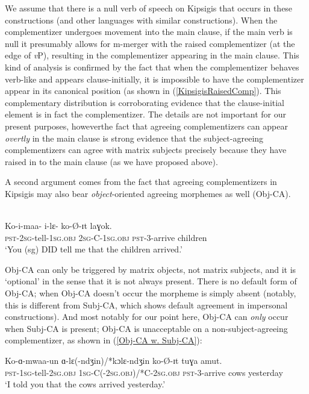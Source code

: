 We assume that there is a null verb of speech on Kipsigis that occurs in these constructions (and other languages with similar constructions). When the complementizer undergoes movement into the main clause, if the main verb is null it presumably allows for m-merger with the raised complementizer (at the edge of \textit{v}P), resulting in the complementizer appearing in the main clause. This kind of analysis is confirmed by the fact that when the complementizer behaves verb-like and appears clause-initially, it is impossible to have the complementizer appear in its canonical position (as shown in (\ref{KipsigisRaisedComp}). This complementary distribution is corroborating evidence that the clause-initial element is in fact the complementizer. The details are not important for our present purposes, however\textemdash the fact that agreeing complementizers can appear \textit{overtly} in the main clause is strong evidence that the subject-agreeing complementizers can agree with matrix subjects precisely because they have raised in to the main clause (as we have proposed above).  

A second argument comes from the fact that agreeing complementizers in Kipsigis may also bear \textit{object}-oriented agreeing morphemes as well (Obj-CA). 

\ea \label{ObjCAExample} 
\\
\gll Ko-i-maa- i-lɛ- ko-\O-ɪt laɣok. \\
\textsc{pst}-2\textsc{sg}-tell-1\textsc{sg}.\textsc{obj} 2\textsc{sg}-C-1\textsc{sg}.\textsc{obj} \textsc{pst}-3-arrive children \\ 
\glt `You (sg) DID tell me that the children arrived.'
\z

\noindent Obj-CA can only be triggered by matrix objects, not matrix subjects, and it is `optional' in the sense that it is not always present. There is no default form of Obj-CA; when Obj-CA doesn't occur the morpheme is simply absent (notably, this is different from Subj-CA, which shows default agreement in impersonal constructions). And most notably for our point here, Obj-CA can \textit{only} occur when Subj-CA is present; Obj-CA is unacceptable on a non-subject-agreeing complementizer, as shown in (\ref{Obj-CA w. Subj-CA}): 

\ea \label{Obj-CA w. Subj-CA}
\gll Ko-ɑ-mwaa-un ɑ-lɛ(-ndʒin)/*kɔlɛ-ndʒin ko-\O-ɪt tuɣa amut. \\
\textsc{pst}-1\textsc{sg}-tell-2\textsc{sg}.\textsc{obj} 1\textsc{sg}-C(-2\textsc{sg}.\textsc{obj})/*C-2\textsc{sg}.\textsc{obj} \textsc{pst}-3-arrive cows yesterday \\
\glt `I told you that the cows arrived yesterday.'
\z

